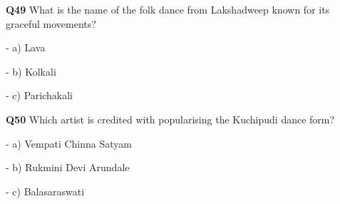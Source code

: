 \textbf{Q49} What is the name of the folk dance from Lakshadweep known for its graceful movements?\par
\quad - a) Lava\par
\quad - b) Kolkali\par
\quad - c) Parichakali\par

\textbf{Q50} Which artist is credited with popularising the Kuchipudi dance form?\par
\quad - a) Vempati Chinna Satyam\par
\quad - b) Rukmini Devi Arundale\par
\quad - c) Balasaraswati\par